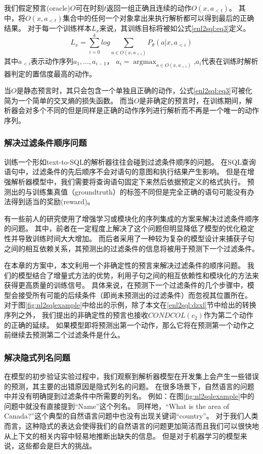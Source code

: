 我们假定预言(oracle)$O$可在时刻$t$返回一组正确且连续的动作$O(x,a_{<t})$。
其中，将$O(x,a_{<t})$集合中的任何一个对象拿出来执行解析都可以得到最后的正确结果。
对于每一个训练样本$L_x$来说，其训练目标将被如公式\ref{enl2sql:eq3}定义。
\begin{equation}
  \label{enl2sql:eq3}
  L_x = \sum_{i=0}^k log \sum_{a\in O(x,a_{<i})} P_{\theta}(a|x,a_{<i})
\end{equation}
其中$a_{<i}$表示动作序列$a_{1},...,a_{i-1}$，
$a_{i} = \mathop{\arg\max}_{a\in O(x,a_{<i})}$,$a_i$代表在训练时解析器判定的置信度最高的动作。

当$O$是静态预言时，其只会包含一个单独且正确的动作，公式\ref{enl2sql:eq3}可被化简为一个简单的交叉熵的损失函数。
而当$O$是非确定的预言时，在训练期间，解析器会对多个不同的但是同样是正确的动作序列进行解析而不再是一个唯一的动作序列。

\subsubsection{解决过滤条件顺序问题}
\label{enl2sql:om}

训练一个形如text-to-SQL的解析器往往会碰到过滤条件顺序的问题。
在SQL查询语句中，过滤条件的先后顺序不会对语句的意图和执行结果产生影响。
但是在增强解析器模型中，我们需要将查询语句固定下来然后依据预定义的格式执行。
预测出的与训练集真值（groundtruth）的标签不同但是完全正确的语句可能没有办法得到适当的奖励(reward)。

有一些前人的研究使用了增强学习\cite{zhong2017seq2sql}或模块化的序列集成\cite{xu2017sqlnet}的方案来解决过滤条件顺序的问题。
其中，前者在一定程度上解决了这个问题但明显降低了模型的优化稳定性并导致训练时间大大增加。
而后者采用了一种较为复杂的模型设计来捕获子句之间的相互依赖关系，其预测出的过滤条件的信息将被用于预测下一个过滤条件。

在本章的方案中，本文利用一个非确定性的预言来解决过滤条件的顺序问题。
我们的模型结合了增量式方法的优势，利用子句之间的相互依赖性和模块化的方法来获得更高质量的训练信号。
具体来说，在预测下一个过滤条件的几个步骤中，模型会接受所有可能的后续条件（即尚未预测出的过滤条件）而忽视其位置所在。
对于图\ref{fig:nl2sqlexample}中给出的示例，除了本文在\ref{enl2sql:dzxl}节中给出的转换序列之外，
我们提出的非确定性的预言也接收$CONDCOL(c_2)$作为第二个动作的正确的延续。
如果模型即将预测出第一个动作，那么它将在预测第一个动作之前继续去预测第二个过滤条件是什么。
\subsubsection{解决隐式列名问题}
\label{enl2sql:icn}
在模型的初步验证实验过程中，我们观察到解析器模型在开发集上会产生一些错误的预测，其主要的出错原因是隐式列名的问题。
在很多场景下，自然语言的问题中并没有明确提到过滤条件中所需要的列名。
例如：在图\ref{fig:nl2sqlexample}中的问题中就没有直接提到“Name”这个列名。
同样地，“What is the area of Canada?”这个典型的自然语言问题中也没有出现关键词“country”。
对于我们人类而言，这种隐式的表达会使得我们的自然语言的问题更加简洁而且我们可以很快地从上下文的相关内容中轻易地推断出缺失的信息。
但是对于机器学习的模型来说，这些都会是巨大的挑战。


